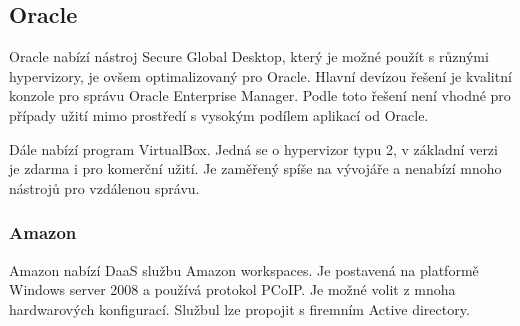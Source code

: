 \subsection{Oracle}
Oracle nabízí nástroj Secure Global Desktop, který je možné použít s různými hypervizory, je ovšem optimalizovaný pro Oracle. Hlavní devízou řešení je kvalitní konzole pro správu Oracle Enterprise Manager. Podle  toto řešení není vhodné pro případy užití mimo prostředí s vysokým podílem aplikací od Oracle.

Dále nabízí program VirtualBox. Jedná se o hypervizor typu 2, v základní verzi je zdarma i pro komerční užití. Je zaměřený spíše na vývojáře a nenabízí mnoho nástrojů pro vzdálenou správu. 

\subsubsection{Amazon}

Amazon nabízí DaaS službu Amazon workspaces. Je postavená na platformě Windows server 2008 a používá protokol PCoIP. Je možné volit z mnoha hardwarových konfigurací. Službul lze propojit s firemním Active directory. 